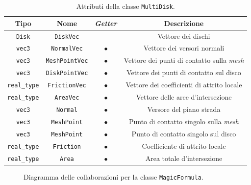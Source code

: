 \begin{table}[h!]
	\centering
	\begin{tabular}{|c|c|c|c|}
		\hline 
		\textbf{Tipo} & \textbf{Nome} & \textit{\textbf{Getter}} & \textbf{Descrizione} \\ \hline 
		\texttt{Disk} & \texttt{DiskVec} &  & Vettore dei dischi \\ \hline 
		\texttt{vec3} & \texttt{NormalVec} & $\bullet$ & Vettore dei versori normali \\ \hline
		\texttt{vec3} & \texttt{MeshPointVec} & $\bullet$ & Vettore dei punti di contatto sulla \textit{mesh} \\ \hline
		\texttt{vec3} & \texttt{DiskPointVec} & $\bullet$ & Vettore dei punti di contatto sul disco \\ \hline
		\texttt{real\_type} & \texttt{FrictionVec} & $\bullet$ & Vettore dei coefficienti di attrito locale \\ \hline
		\texttt{real\_type} & \texttt{AreaVec} & $\bullet$ & Vettore delle aree d'intersezione \\ \hline
		\texttt{vec3} & \texttt{Normal} & $\bullet$ & Versore del piano strada \\ \hline
		\texttt{vec3} & \texttt{MeshPoint} & $\bullet$ & Punto di contatto singolo sulla \textit{mesh} \\ \hline
		\texttt{vec3} & \texttt{MeshPoint} & $\bullet$ & Punto di contatto singolo sul disco \\ \hline
		\texttt{real\_type} & \texttt{Friction} & $\bullet$ & Coefficiente di attrito locale \\ \hline
		\texttt{real\_type} & \texttt{Area} & $\bullet$ & Area totale d'intersezione \\ \hline
	\end{tabular}
	\caption{Attributi della classe \texttt{MultiDisk}.}
	\label{}
\end{table}
%
\begin{figure}[h!]
	\centering
	\caption{Diagramma delle collaborazioni per la classe \texttt{MagicFormula}.}
\end{figure}
